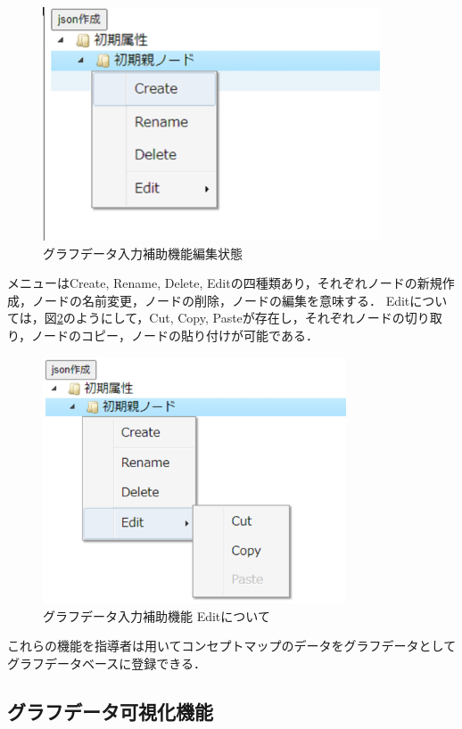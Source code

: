 \begin{figure}[htbp]
\begin{center}
\includegraphics[width=10cm]{img/hojo_change_name.eps}
\end{center}
\caption{グラフデータ入力補助機能編集状態}
\label{fig:hojo_change_name}
\end{figure}

\newpage
メニューはCreate, Rename, Delete, Editの四種類あり，それぞれノードの新規作成，ノードの名前変更，ノードの削除，ノードの編集を意味する．
Editについては，図\ref{fig:hojo_edit}のようにして，Cut, Copy, Pasteが存在し，それぞれノードの切り取り，ノードのコピー，ノードの貼り付けが可能である．

\begin{figure}[htbp]
\begin{center}
\includegraphics[width=9cm]{img/hojo_edit.eps}
\end{center}
\caption{グラフデータ入力補助機能 Editについて}
\label{fig:hojo_edit}
\end{figure}

これらの機能を指導者は用いてコンセプトマップのデータをグラフデータとしてグラフデータベースに登録できる．
\newpage
\subsection{グラフデータ可視化機能}\label{subsec:kasi}
